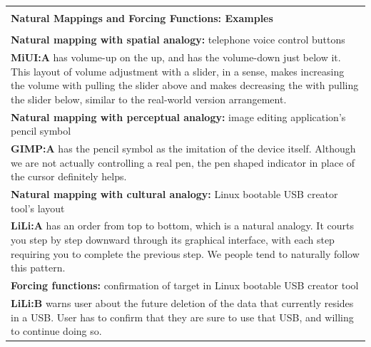 \documentclass[a4paper,11pt,oneside]{scrreprt}
\begin{document}
\clearpage



\begin{table}[h]
	\begin{tabularx}{\textwidth}{|X|}
		
		\hline
			\\
			\textbf{Natural Mappings and Forcing Functions: Examples} \\
			\\
		\hline
		
			\textbf{Natural mapping with spatial analogy:} telephone voice control buttons			\\
			\textbf{MiUI:A} has volume-up on the up, and has the volume-down just below it. This layout of volume adjustment with a slider, in a sense, makes increasing the volume with pulling the slider above and makes decreasing the with pulling the slider below, similar to the real-world version arrangement. \\
			
		\hline
				
			\textbf{Natural mapping with perceptual analogy:} image editing application's pencil symbol\\
			\textbf{GIMP:A}	has the pencil symbol as the imitation of the device itself. Although we are not actually controlling a real pen, the pen shaped indicator in place of the cursor definitely helps. \\
			
		\hline
		
			\textbf{Natural mapping with cultural analogy:}	Linux bootable USB creator tool's layout		\\
			\textbf{LiLi:A} has an order from top to bottom, which is a natural analogy. It courts you step by step downward through its graphical interface, with each step requiring you to complete the previous step. We people tend to naturally follow this pattern.\\
			
		\hline
		
			\textbf{Forcing functions:} confirmation of target in Linux bootable USB creator tool			\\
			\textbf{LiLi:B} warns user about the future deletion of the data that currently resides in a USB. User has to confirm that they are sure to use that USB, and willing to continue doing so.\\
			
			\hline
		
		\hline
	\end{tabularx}
\end{table}
\end{document}
